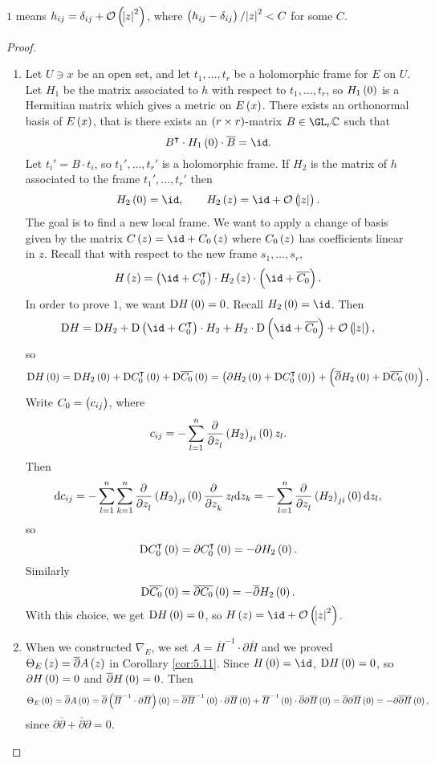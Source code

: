 $ 1 $ means $ h_{ij} = \delta_{ij} + \OOO\br{\abs{z}^2} $, where $ \br{h_{ij} - \delta_{ij}} / \abs{z}^2 < C $ for some $ C $.

\begin{proof}
\hfill
\begin{enumerate}
\item Let $ U \ni x $ be an open set, and let $ t_1, \dots, t_r $ be a holomorphic frame for $ E $ on $ U $. Let $ H_1 $ be the matrix associated to $ h $ with respect to $ t_1, \dots, t_r $, so $ H_1\br{0} $ is a Hermitian matrix which gives a metric on $ E\br{x} $. There exists an orthonormal basis of $ E\br{x} $, that is there exists an $ \br{r \times r} $-matrix $ B \in \GL_r \CC $ such that
$$ B^\intercal \cdot H_1\br{0} \cdot \overline{B} = \id. $$
Let $ t_i' = B \cdot t_i $, so $ t_1', \dots, t_r' $ is a holomorphic frame. If $ H_2 $ is the matrix of $ h $ associated to the frame $ t_1', \dots, t_r' $ then
$$ H_2\br{0} = \id, \qquad H_2\br{z} = \id + \OOO\br{\abs{z}}. $$
The goal is to find a new local frame. We want to apply a change of basis given by the matrix $ C\br{z} = \id + C_0\br{z} $ where $ C_0\br{z} $ has coefficients linear in $ z $. Recall that with respect to the new frame $ s_1, \dots, s_r $,
$$ H\br{z} = \br{\id + C_0^\intercal} \cdot H_2\br{z} \cdot \br{\id + \overline{C_0}}. $$
In order to prove $ 1 $, we want $ \D H\br{0} = 0 $. Recall $ H_2\br{0} = \id $. Then
$$ \D H = \D H_2 + \D\br{\id + C_0^\intercal} \cdot H_2 + H_2 \cdot \D\br{\id + \overline{C_0}} + \OOO\br{\abs{z}}, $$
so
$$ \D H\br{0} = \D H_2\br{0} + \D C_0^\intercal\br{0} + \D\overline{C_0}\br{0} = \br{\partial H_2\br{0} + \D C_0^\intercal\br{0}} + \br{\overline{\partial}H_2\br{0} + \D\overline{C_0}\br{0}}. $$
Write $ C_0 = \br{c_{ij}} $, where
$$ c_{ij} = -\sum_{l = 1}^n \dpd{}{z_l}\br{H_2}_{ji}\br{0}z_l. $$
Then
$$ \d c_{ij} = -\sum_{l = 1}^n \sum_{k = 1}^n \dpd{}{z_l}\br{H_2}_{ji}\br{0}\dpd{}{z_k}z_l \d z_k = -\sum_{l = 1}^n \dpd{}{z_l}\br{H_2}_{ji}\br{0} \d z_l, $$
so
$$ \D C_0^\intercal\br{0} = \partial C_0^\intercal\br{0} = -\partial H_2\br{0}. $$
Similarly
$$ \D\overline{C_0}\br{0} = \overline{\partial}\overline{C_0}\br{0} = -\overline{\partial}H_2\br{0}. $$
With this choice, we get $ \D H\br{0} = 0 $, so $ H\br{z} = \id + \OOO\br{\abs{z}^2} $.


\item When we constructed $ \nabla_E $, we set $ A = \overline{H}^{-1} \cdot \partial\overline{H} $ and we proved $ \Theta_E\br{z} = \overline{\partial}A\br{z} $ in Corollary \ref{cor:5.11}. Since $ H\br{0} = \id $, $ \D H\br{0} = 0 $, so $ \partial H\br{0} = 0 $ and $ \overline{\partial}H\br{0} = 0 $. Then
$$ \Theta_E\br{0} = \overline{\partial}A\br{0} = \overline{\partial}\br{\overline{H}^{-1} \cdot \partial\overline{H}}\br{0} = \overline{\partial}\overline{H}^{-1}\br{0} \cdot \partial\overline{H}\br{0} + \overline{H}^{-1}\br{0} \cdot \overline{\partial}\partial\overline{H}\br{0} = \overline{\partial}\partial\overline{H}\br{0} = -\partial\overline{\partial}\overline{H}\br{0}, $$
since $ \partial\overline{\partial} + \overline{\partial}\partial = 0 $.
\end{enumerate}
\end{proof}

